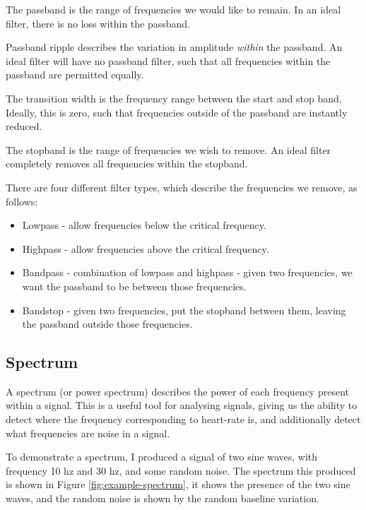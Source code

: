 \documentclass[12pt,a4paper,twoside,openright]{report}
\begin{document}
The passband is the range of frequencies we would like to remain. In an ideal
filter, there is no loss within the passband.

Passband ripple describes the variation in amplitude \emph{within} the
passband. An ideal filter will have no passband filter, such that all
frequencies within the passband are permitted equally.

The transition width is the frequency range between the start and stop band.
Ideally, this is zero, such that frequencies outside of the passband are
instantly reduced.

The stopband is the range of frequencies we wish to remove. An ideal filter
completely removes all frequencies within the stopband.

There are four different filter types, which describe the frequencies we remove, as
follows:

\begin{itemize}
	\item Lowpass - allow frequencies below the critical frequency.

	\item Highpass - allow frequencies above the critical frequency.

	\item Bandpass - combination of lowpass and highpass - given two
		frequencies, we want the passband to be between those
		frequencies.

	\item Bandstop - given two frequencies, put the stopband between them,
		leaving the passband outside those frequencies.
\end{itemize}

\subsection{Spectrum}

A spectrum (or power spectrum) describes the power of each frequency present
within a signal.
This is a useful tool for analysing signals, giving us the ability to detect
where the frequency corresponding to heart-rate is, and additionally detect
what frequencies are noise in a signal.

To demonstrate a spectrum, I produced a signal of two sine waves, with
frequency 10 hz
and 30 hz, and some random noise. The spectrum this produced is shown in 
Figure \ref{fig:example-spectrum}, it shows the presence of the two sine
waves, and the random noise is shown by the random baseline variation.
\end{document}

